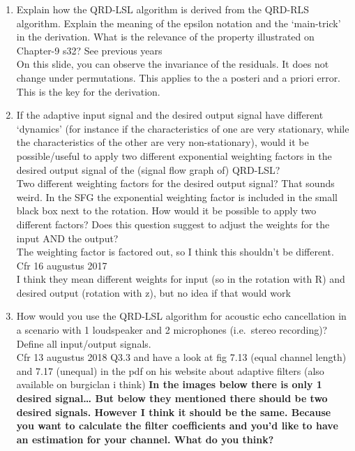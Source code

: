 \documentclass[
  a4paper,
  ,captions=tableheading
]{scrartcl}
\begin{document}
\begin{enumerate}
\def\labelenumi{\arabic{enumi}.}
\item
  Explain how the QRD-LSL algorithm is derived from the QRD-RLS
  algorithm. Explain the meaning of the epsilon notation and the
  `main-trick' in the derivation. What is the relevance of the property
  illustrated on Chapter-9 s32? See previous years\\
  On this slide, you can observe the invariance of the residuals. It
  does not change under permutations. This applies to the a posteri and
  a priori error. This is the key for the derivation.\\
\item
  If the adaptive input signal and the desired output signal have
  different `dynamics' (for instance if the characteristics of one are
  very stationary, while the characteristics of the other are very
  non-stationary), would it be possible/useful to apply two different
  exponential weighting factors in the desired output signal of the
  (signal flow graph of) QRD-LSL?\\
  Two different weighting factors for the desired output signal? That
  sounds weird. In the SFG the exponential weighting factor is included
  in the small black box next to the rotation. How would it be possible
  to apply two different factors? Does this question suggest to adjust
  the weights for the input AND the output?\\
  The weighting factor is factored out, so I think this shouldn't be
  different.\\
  Cfr 16 augustus 2017\\
  I think they mean different weights for input (so in the rotation with
  R) and desired output (rotation with z), but no idea if that would
  work
\item
  How would you use the QRD-LSL algorithm for acoustic echo cancellation
  in a scenario with 1 loudspeaker and 2 microphones (i.e.~stereo
  recording)? Define all input/output signals.\\
  Cfr 13 augustus 2018 Q3.3 and have a look at fig 7.13 (equal channel
  length) and 7.17 (unequal) in the pdf on his website about adaptive
  filters (also available on burgiclan i think) \textbf{In the images
  below there is only 1 desired signal\ldots{} But below they mentioned
  there should be two desired signals. However I think it should be the
  same. Because you want to calculate the filter coefficients and you'd
  like to have an estimation for your channel. What do you think?}\\

\end{enumerate}
\end{document}
